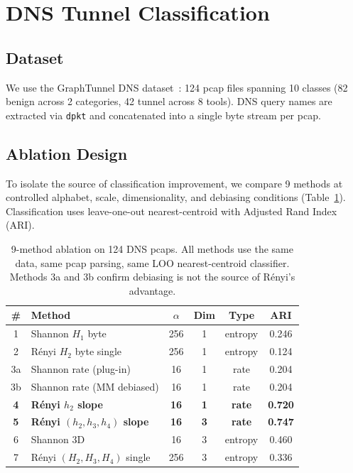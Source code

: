 \documentclass[conference]{IEEEtran}
\begin{document}
\section{DNS Tunnel Classification}
\label{sec:classification}

\subsection{Dataset}

We use the GraphTunnel DNS dataset~\cite{gao2024graphtunnel}: 124 pcap files spanning 10 classes (82 benign across 2 categories, 42 tunnel across 8 tools). DNS query names are extracted via \texttt{dpkt} and concatenated into a single byte stream per pcap.

\subsection{Ablation Design}

To isolate the source of classification improvement, we compare 9 methods at controlled alphabet, scale, dimensionality, and debiasing conditions (Table~\ref{tab:ablation}). Classification uses leave-one-out nearest-centroid with Adjusted Rand Index (ARI).

\begin{table}[t]
\centering
\caption{9-method ablation on 124 DNS pcaps. All methods use the same data, same pcap parsing, same LOO nearest-centroid classifier. Methods 3a and 3b confirm debiasing is not the source of Rényi's advantage.}
\label{tab:ablation}
\begin{tabular}{clcccc}
\toprule
\# & Method & $\alpha$ & Dim & Type & ARI \\
\midrule
1 & Shannon $H_1$ byte & 256 & 1 & entropy & 0.246 \\
2 & R\'enyi $H_2$ byte single & 256 & 1 & entropy & 0.124 \\
3a & Shannon rate (plug-in) & 16 & 1 & rate & 0.204 \\
3b & Shannon rate (MM debiased) & 16 & 1 & rate & 0.204 \\
\textbf{4} & \textbf{R\'enyi $h_2$ slope} & \textbf{16} & \textbf{1} & \textbf{rate} & \textbf{0.720} \\
\textbf{5} & \textbf{R\'enyi $(h_2,h_3,h_4)$ slope} & \textbf{16} & \textbf{3} & \textbf{rate} & \textbf{0.747} \\
6 & Shannon 3D & 16 & 3 & entropy & 0.460 \\
7 & R\'enyi $(H_2,H_3,H_4)$ single & 256 & 3 & entropy & 0.336 \\
\bottomrule
\end{tabular}
\end{table}
\end{document}

